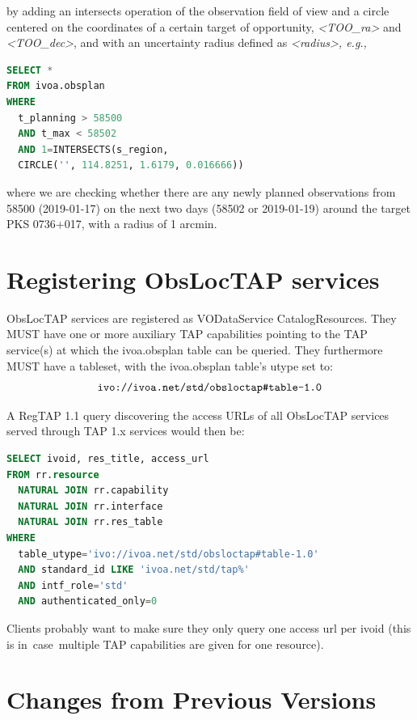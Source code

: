 \documentclass[11pt,a4paper]{ivoa}
\begin{document}
by adding an intersects operation of the observation field of view and a circle
centered on the coordinates of a certain target of opportunity,
\textit{<TOO\_ra>} and \textit{<TOO\_dec>}, and with an uncertainty
radius defined as \textit{<radius>, e.g.,}

\begin{lstlisting}[language=SQL]
SELECT * 
FROM ivoa.obsplan
WHERE
  t_planning > 58500
  AND t_max < 58502
  AND 1=INTERSECTS(s_region,
  CIRCLE('', 114.8251, 1.6179, 0.016666))
\end{lstlisting}
where we are checking whether there are any newly planned observations from
58500 (2019-01-17) on the next two days (58502 or 2019-01-19) around the target
PKS 0736+017, with a radius of 1 arcmin.
\par


\section{Registering ObsLocTAP services}
\label{sec:Registering}
ObsLocTAP services are registered as VODataService CatalogResources. They MUST
have one or more auxiliary TAP capabilities pointing to the TAP service(s) at
which the ivoa.obsplan table can be queried. They furthermore MUST have a
tableset, with the ivoa.obsplan table's utype set to:
$$\hbox{\verb|ivo://ivoa.net/std/obsloctap#table-1.0|}$$

A RegTAP 1.1 query discovering the access URLs of all ObsLocTAP services served
through TAP 1.x services would then be:

\begin{lstlisting}[language=SQL]
SELECT ivoid, res_title, access_url
FROM rr.resource
  NATURAL JOIN rr.capability
  NATURAL JOIN rr.interface
  NATURAL JOIN rr.res_table
WHERE
  table_utype='ivo://ivoa.net/std/obsloctap#table-1.0'
  AND standard_id LIKE 'ivoa.net/std/tap%'
  AND intf_role='std'
  AND authenticated_only=0
\end{lstlisting}
Clients probably want to make sure they only query one access url per ivoid
(this is in\ case\ multiple TAP capabilities are given for one resource).
\par

\appendix
\section{Changes from Previous Versions}
\end{document}
